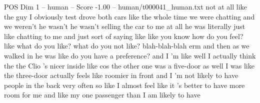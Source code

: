 \begin{textsample}{POS Dim 1 – human – Score -1.00 – human/t000041\_human.txt}  \label{ex:f1_pos_017}
not at all like the guy I obviously test drove both cars like the whole time we were chatting and we weren't he wasn't he wasn't selling the car to me at all he was literally just like chatting to me and just sort of saying like like you know how do you feel? like what do you like? what do you not like? blah-blah-blah erm and then as we walked in he was like do you have a preference? and I 'm like well I actually think the the Clio 's nicer inside like cos the other one was a five-door as well I was like the three-door actually feels like roomier in front and I 'm not likely to have people in the back very often so like I almost feel like it 's better to have more room for me and like my one passenger than I am likely to have

\end{textsample}
